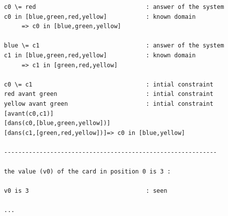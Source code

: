 \documentclass[a4paper,12pt]{article}
\begin{document}
\begin{enumerate}
\begin{Verbatim}
c0 \= red                               : answer of the system 
c0 in [blue,green,red,yellow]           : known domain 
     => c0 in [blue,green,yellow]

blue \= c1                              : answer of the system 
c1 in [blue,green,red,yellow]           : known domain 
     => c1 in [green,red,yellow]

c0 \= c1                                : intial constraint 
red avant green                         : intial constraint 
yellow avant green                      : intial constraint 
[avant(c0,c1)]
[dans(c0,[blue,green,yellow])]
[dans(c1,[green,red,yellow])]=> c0 in [blue,yellow]

------------------------------------------------------------

the value (v0) of the card in position 0 is 3 : 

v0 is 3                                 : seen 

...

\end{Verbatim}
		
\end{enumerate}
\end{document}
